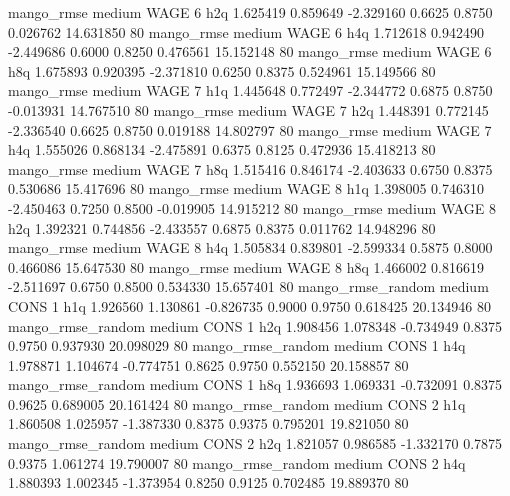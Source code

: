        mango_rmse     medium     WAGE                 6                  h2q  1.625419 0.859649 -2.329160 0.6625 0.8750  0.026762   14.631850 80
       mango_rmse     medium     WAGE                 6                  h4q  1.712618 0.942490 -2.449686 0.6000 0.8250  0.476561   15.152148 80
       mango_rmse     medium     WAGE                 6                  h8q  1.675893 0.920395 -2.371810 0.6250 0.8375  0.524961   15.149566 80
       mango_rmse     medium     WAGE                 7                  h1q  1.445648 0.772497 -2.344772 0.6875 0.8750 -0.013931   14.767510 80
       mango_rmse     medium     WAGE                 7                  h2q  1.448391 0.772145 -2.336540 0.6625 0.8750  0.019188   14.802797 80
       mango_rmse     medium     WAGE                 7                  h4q  1.555026 0.868134 -2.475891 0.6375 0.8125  0.472936   15.418213 80
       mango_rmse     medium     WAGE                 7                  h8q  1.515416 0.846174 -2.403633 0.6750 0.8375  0.530686   15.417696 80
       mango_rmse     medium     WAGE                 8                  h1q  1.398005 0.746310 -2.450463 0.7250 0.8500 -0.019905   14.915212 80
       mango_rmse     medium     WAGE                 8                  h2q  1.392321 0.744856 -2.433557 0.6875 0.8375  0.011762   14.948296 80
       mango_rmse     medium     WAGE                 8                  h4q  1.505834 0.839801 -2.599334 0.5875 0.8000  0.466086   15.647530 80
       mango_rmse     medium     WAGE                 8                  h8q  1.466002 0.816619 -2.511697 0.6750 0.8500  0.534330   15.657401 80
mango_rmse_random     medium     CONS                 1                  h1q  1.926560 1.130861 -0.826735 0.9000 0.9750  0.618425   20.134946 80
mango_rmse_random     medium     CONS                 1                  h2q  1.908456 1.078348 -0.734949 0.8375 0.9750  0.937930   20.098029 80
mango_rmse_random     medium     CONS                 1                  h4q  1.978871 1.104674 -0.774751 0.8625 0.9750  0.552150   20.158857 80
mango_rmse_random     medium     CONS                 1                  h8q  1.936693 1.069331 -0.732091 0.8375 0.9625  0.689005   20.161424 80
mango_rmse_random     medium     CONS                 2                  h1q  1.860508 1.025957 -1.387330 0.8375 0.9375  0.795201   19.821050 80
mango_rmse_random     medium     CONS                 2                  h2q  1.821057 0.986585 -1.332170 0.7875 0.9375  1.061274   19.790007 80
mango_rmse_random     medium     CONS                 2                  h4q  1.880393 1.002345 -1.373954 0.8250 0.9125  0.702485   19.889370 80
